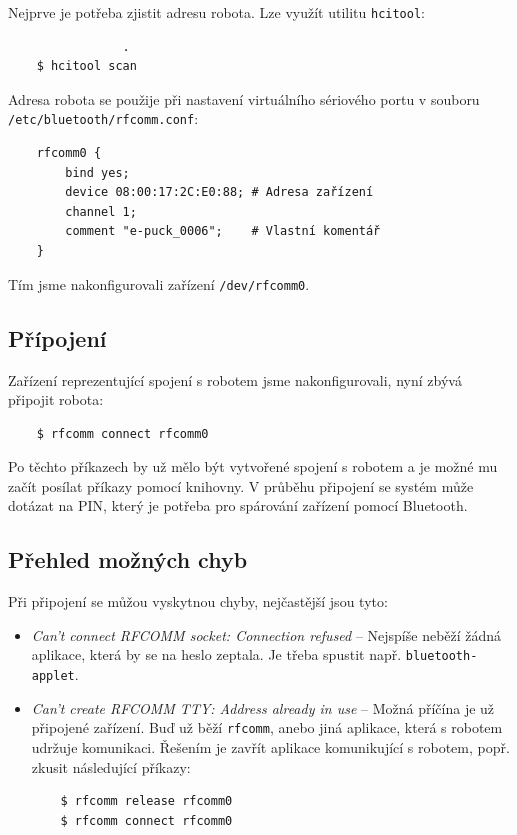 \documentclass[12pt,notitlepage]{report}
\begin{document}
    Nejprve je potřeba zjistit adresu robota. Lze využít utilitu {\tt hcitool}:

    \begin{verbatim}                .
    $ hcitool scan
    \end{verbatim}

    Adresa robota se použije při nastavení virtuálního sériového portu v
    souboru {\tt /etc/bluetooth/rfcomm.conf}:

    \begin{verbatim}
    rfcomm0 {
        bind yes;
        device 08:00:17:2C:E0:88; # Adresa zařízení
        channel 1;
        comment "e-puck_0006";    # Vlastní komentář
    }
    \end{verbatim}

    Tím jsme nakonfigurovali zařízení {\tt /dev/rfcomm0}.

    \subsection{Přípojení}

    Zařízení reprezentující spojení s robotem jsme nakonfigurovali, nyní zbývá
    připojit robota:

    \begin{verbatim}
    $ rfcomm connect rfcomm0
    \end{verbatim}

    Po těchto příkazech by už mělo být vytvořené spojení s robotem a je možné
    mu začít posílat příkazy pomocí knihovny. V průběhu připojení se systém
    může dotázat na PIN, který je potřeba pro spárování zařízení pomocí
    Bluetooth.

    \subsection{Přehled možných chyb}
    Při připojení se můžou vyskytnou chyby, nejčastější jsou tyto:
    \begin{itemize}
    \item{{\em Can't connect RFCOMM socket: Connection refused} -- Nejspíše
        neběží žádná aplikace, která by se na heslo zeptala. Je třeba spustit
        např. {\tt bluetooth-applet}.}
    \item{{\em Can't create RFCOMM TTY: Address already in use} -- Možná
        příčína je už připojené zařízení. Buď už běží {\tt rfcomm}, anebo jiná
        aplikace, která s robotem udržuje komunikaci. Řešením je zavřít
        aplikace komunikující s robotem, popř. zkusit následující příkazy:
    \begin{verbatim}
    $ rfcomm release rfcomm0
    $ rfcomm connect rfcomm0
    \end{verbatim}
    }
    \end{itemize}
\end{document}
